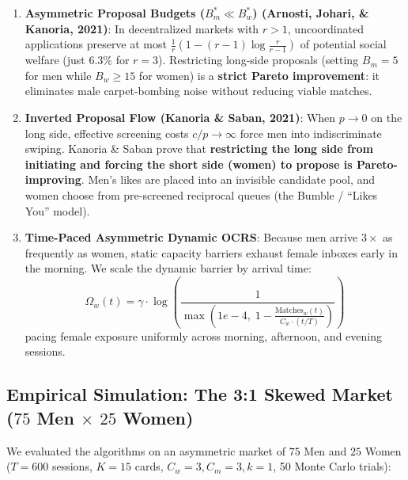 \documentclass[11pt,letterpaper]{article}
\theoremstyle{definition}
\theoremstyle{plain}
\theoremstyle{remark}
\begin{document}
\begin{enumerate}[leftmargin=2em]
    \item \textbf{Asymmetric Proposal Budgets ($B_m^* \ll B_w^*$) (Arnosti, Johari, \& Kanoria, 2021)}:
    In decentralized markets with $r > 1$, uncoordinated applications preserve at most $\frac{1}{r}(1 - (r-1)\log\frac{r}{r-1})$ of potential social welfare (just $6.3\%$ for $r=3$). 
    Restricting long-side proposals (setting $B_m = 5$ for men while $B_w \ge 15$ for women) is a \textbf{strict Pareto improvement}: it eliminates male carpet-bombing noise without reducing viable matches.
    \item \textbf{Inverted Proposal Flow (Kanoria \& Saban, 2021)}:
    When $p \to 0$ on the long side, effective screening costs $c/p \to \infty$ force men into indiscriminate swiping. Kanoria \& Saban prove that \textbf{restricting the long side from initiating and forcing the short side (women) to propose is Pareto-improving}. Men's likes are placed into an invisible candidate pool, and women choose from pre-screened reciprocal queues (the Bumble / ``Likes You'' model).
    \item \textbf{Time-Paced Asymmetric Dynamic OCRS}:
    Because men arrive $3\times$ as frequently as women, static capacity barriers exhaust female inboxes early in the morning. We scale the dynamic barrier by arrival time:
    \begin{equation}
        \Omega_w(t) = \gamma \cdot \log\left( \frac{1}{\max\left(1e-4, \; 1 - \frac{\text{Matches}_w(t)}{C_w \cdot (t/T)}\right)} \right)
    \end{equation}
    pacing female exposure uniformly across morning, afternoon, and evening sessions.
\end{enumerate}

\subsection{Empirical Simulation: The 3:1 Skewed Market ($75$ Men $\times$ $25$ Women)}
We evaluated the algorithms on an asymmetric market of $75$ Men and $25$ Women ($T=600$ sessions, $K=15$ cards, $C_w=3, C_m=3, k=1$, 50 Monte Carlo trials):
\end{document}

